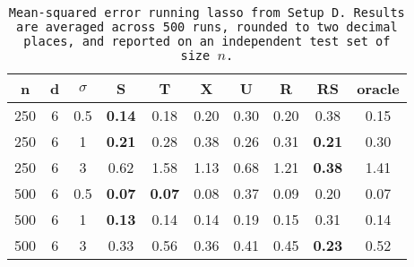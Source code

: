 \begin{table}[ht]
\centering
\begin{tabular}{cccccccccc}
  \hline
n & d & $\sigma$ & S & T & X & U & R & RS & oracle \\ 
  \hline
250 & 6 & 0.5 & \bf 0.14 &  0.18 & 0.20 &  0.30 & 0.20 & 0.38 & 0.15 \\ 
  250 & 6 & 1 & \bf 0.21 &  0.28 & 0.38 &  0.26 & 0.31 & \bf 0.21 & 0.30 \\ 
  250 & 6 & 3 & 0.62 &  1.58 & 1.13 &  0.68 & 1.21 & \bf 0.38 & 1.41 \\ 
  500 & 6 & 0.5 & \bf 0.07 & \bf  0.07 & 0.08 &  0.37 & 0.09 & 0.20 & 0.07 \\ 
  500 & 6 & 1 & \bf 0.13 &  0.14 & 0.14 &  0.19 & 0.15 & 0.31 & 0.14 \\ 
  500 & 6 & 3 & 0.33 &  0.56 & 0.36 &  0.41 & 0.45 & \bf 0.23 & 0.52 \\ 
   \hline
\end{tabular}
\caption{\tt Mean-squared error running \texttt{lasso} from Setup D. Results are averaged across 500 runs, rounded to two decimal places, and reported on an independent test set of size $n$.} 
\label{table:setup4}
\end{table}
